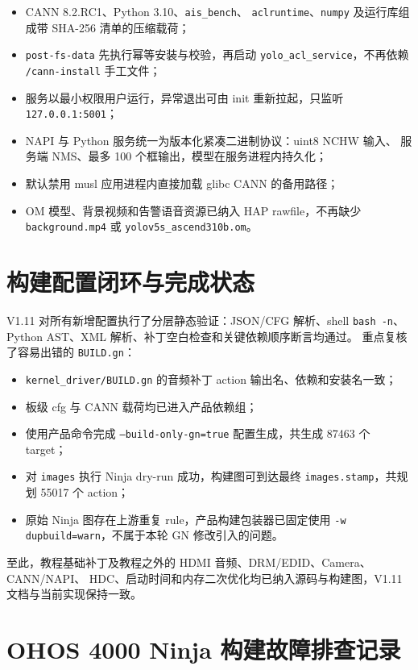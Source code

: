 \begin{itemize}
  \item CANN 8.2.RC1、Python 3.10、\texttt{ais\_bench}、
  \texttt{aclruntime}、\texttt{numpy} 及运行库组成带 SHA-256 清单的压缩载荷；
  \item \texttt{post-fs-data} 先执行幂等安装与校验，再启动
  \texttt{yolo\_acl\_service}，不再依赖 \texttt{/cann-install} 手工文件；
  \item 服务以最小权限用户运行，异常退出可由 init 重新拉起，只监听
  \texttt{127.0.0.1:5001}；
  \item NAPI 与 Python 服务统一为版本化紧凑二进制协议：uint8 NCHW 输入、
  服务端 NMS、最多 100 个框输出，模型在服务进程内持久化；
  \item 默认禁用 musl 应用进程内直接加载 glibc CANN 的备用路径；
  \item OM 模型、背景视频和告警语音资源已纳入 HAP rawfile，不再缺少
  \texttt{background.mp4} 或 \texttt{yolov5s\_ascend310b.om}。
\end{itemize}

\section{构建配置闭环与完成状态}

V1.11 对所有新增配置执行了分层静态验证：JSON/CFG 解析、shell
\texttt{bash -n}、Python AST、XML 解析、补丁空白检查和关键依赖顺序断言均通过。
重点复核了容易出错的 \texttt{BUILD.gn}：

\begin{itemize}
  \item \texttt{kernel\_driver/BUILD.gn} 的音频补丁 action 输出名、依赖和安装名一致；
  \item 板级 cfg 与 CANN 载荷均已进入产品依赖组；
  \item 使用产品命令完成 \texttt{--build-only-gn=true} 配置生成，共生成
  87463 个 target；
  \item 对 \texttt{images} 执行 Ninja dry-run 成功，构建图可到达最终
  \texttt{images.stamp}，共规划 55017 个 action；
  \item 原始 Ninja 图存在上游重复 rule，产品构建包装器已固定使用
  \texttt{-w dupbuild=warn}，不属于本轮 GN 修改引入的问题。
\end{itemize}

至此，教程基础补丁及教程之外的 HDMI 音频、DRM/EDID、Camera、CANN/NAPI、
HDC、启动时间和内存二次优化均已纳入源码与构建图，V1.11 文档与当前实现保持一致。

\section{OHOS 4000 Ninja 构建故障排查记录}

